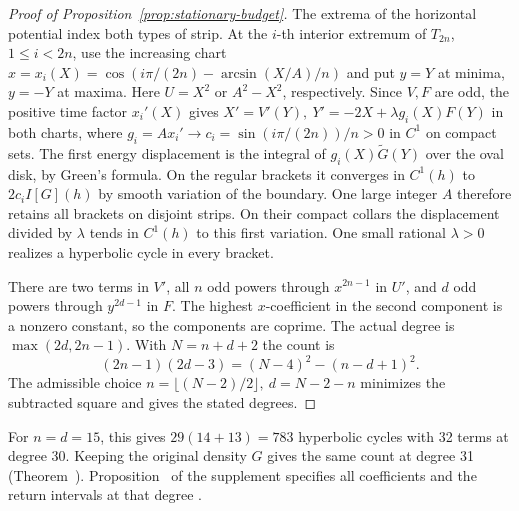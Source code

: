 \begin{proof}[Proof of Proposition~\ref{prop:stationary-budget}]
The extrema of the horizontal potential index both types of strip. At the \(i\)-th interior extremum of \(T_{2n}\), \(1\le i<2n\), use the increasing chart
\(x=x_i(X)=\cos(i\pi/(2n)-\arcsin(X/A)/n)\) and put \(y=Y\) at minima, \(y=-Y\) at maxima. Here \(U=X^2\) or \(A^2-X^2\), respectively. Since \(V,F\) are odd, the positive time factor \(x_i'(X)\) gives \(X'=V'(Y),\ Y'=-2X+\lambda g_i(X)F(Y)\) in both charts, where \(g_i=A x_i'\to c_i=\sin(i\pi/(2n))/n>0\) in \(C^1\) on compact sets. The first energy displacement is the integral of \(g_i(X)\widetilde G(Y)\) over the oval disk, by Green's formula. On the regular brackets it converges in \(C^1(h)\) to \(2c_i I[G](h)\) by smooth variation of the boundary. One large integer \(A\) therefore retains all brackets on disjoint strips. On their compact collars the displacement divided by \(\lambda\) tends in \(C^1(h)\) to this first variation. One small rational \(\lambda>0\) realizes a hyperbolic cycle in every bracket.

There are two terms in \(V'\), all \(n\) odd powers through \(x^{2n-1}\) in \(U'\), and \(d\) odd powers through \(y^{2d-1}\) in \(F\). The highest \(x\)-coefficient in the second component is a nonzero constant, so the components are coprime. The actual degree is \(\max(2d,2n-1)\). With \(N=n+d+2\) the count is
\[
 (2n-1)(2d-3)=(N-4)^2-(n-d+1)^2.
\]
The admissible choice \(n=\lfloor(N-2)/2\rfloor,\ d=N-2-n\) minimizes the subtracted square and gives the stated degrees.
\end{proof}

For \(n=d=15\), this gives \(29(14+13)=783\) hyperbolic cycles with 32 terms at degree 30. Keeping the original density \(G\) gives the same count at degree 31 (Theorem~). Proposition~ of the supplement specifies all coefficients and the return intervals at that degree \cite{LuElectronic}.
